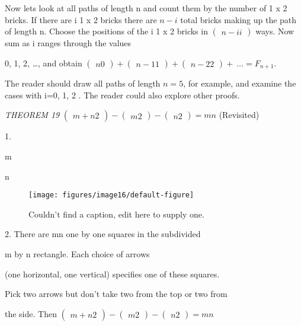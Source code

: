 \documentclass[10pt,letter]{article}
\begin{document}
Now lets look at all paths of length n and count them by the number of 1
x 2 bricks. If there are i 1 x 2 bricks there are \(n - i\) total bricks
making up the path of length n. Choose the positions of the i 1 x 2
bricks in \(\begin{pmatrix}
n - i
i
\end{pmatrix}
\) ways. Now sum as i ranges through the values

0, 1, 2, \ldots{}, and obtain \(\begin{pmatrix}
n
0
\end{pmatrix}
 +
\begin{pmatrix}
n - 1
1
\end{pmatrix}
 +
\begin{pmatrix}
n - 2
2
\end{pmatrix}
 + \ \ldots = F_{n + 1}\).

The reader should draw all paths of length \(n = 5\), for example, and
examine the cases with i=0, 1, 2 . The reader could also explore other
proofs.

\emph{THEOREM 19} \(\begin{pmatrix}
m + n
2
\end{pmatrix}
 -
\begin{pmatrix}
m
2
\end{pmatrix}
 -
\begin{pmatrix}
n
2
\end{pmatrix}
 = mn\) (Revisited)

1.

m

n
\begin{figure}[h!]\begin{center}
\texttt{[image: figures/image16/default-figure]}
\caption{{Couldn't find a caption, edit here to supply one.%
}}
\end{center}
\end{figure}

2.
There are mn one by one squares in the subdivided

m by n rectangle. Each choice of arrows

(one horizontal, one vertical) specifies one of these squares.

Pick two arrows but don't take two from the top or two from

the side. Then \(\begin{pmatrix}
m + n
2
\end{pmatrix}
 -
\begin{pmatrix}
m
2
\end{pmatrix}
 -
\begin{pmatrix}
n
2
\end{pmatrix}
 = mn\)
\end{document}
